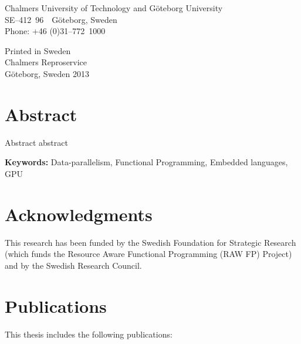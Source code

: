 \documentclass[a4paper]{book}
\newcommand{\uni}{Chalmers University of Technology and G\"oteborg University}
\begin{document}
\vspace{1cm} 

\noindent \uni \\
\noindent SE--412~96~~G\"oteborg, Sweden\\
\noindent Phone: +46 (0)31--772~1000 \\

\vspace{1cm} 

\noindent Printed in Sweden\\
\noindent Chalmers Reproservice\\
\noindent G\"oteborg, Sweden 2013


\thispagestyle{empty}

\clearpage
{}

\section*{Abstract}
Abstract abstract 

\vspace{5mm}

\noindent

\textbf{Keywords:} Data-parallelism, Functional Programming, Embedded languages, GPU

\clearpage

\section*{Acknowledgments}


\vspace{5mm}
\noindent This research has been funded by the Swedish Foundation for
Strategic Research (which funds the Resource Aware Functional 
Programming (RAW FP) Project) and by the Swedish Research Council.

\clearpage

\section*{Publications}

This thesis includes the following publications: 
\end{document}
